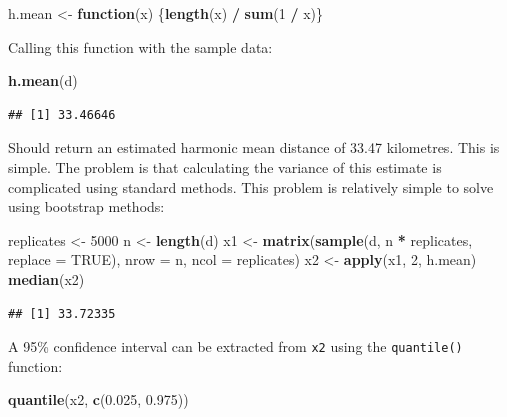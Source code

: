 \documentclass[12pt,a4paper]{book}
\newenvironment{Shaded}{\begin{snugshade}}{\end{snugshade}}
\newcommand{\ControlFlowTok}[1]{\textcolor[rgb]{0.13,0.29,0.53}{\textbf{#1}}}
\newcommand{\DataTypeTok}[1]{\textcolor[rgb]{0.13,0.29,0.53}{#1}}
\newcommand{\DecValTok}[1]{\textcolor[rgb]{0.00,0.00,0.81}{#1}}
\newcommand{\FloatTok}[1]{\textcolor[rgb]{0.00,0.00,0.81}{#1}}
\newcommand{\KeywordTok}[1]{\textcolor[rgb]{0.13,0.29,0.53}{\textbf{#1}}}
\newcommand{\NormalTok}[1]{#1}
\newcommand{\OperatorTok}[1]{\textcolor[rgb]{0.81,0.36,0.00}{\textbf{#1}}}
\newcommand{\OtherTok}[1]{\textcolor[rgb]{0.56,0.35,0.01}{#1}}
\newcommand{\StringTok}[1]{\textcolor[rgb]{0.31,0.60,0.02}{#1}}
\theoremstyle{definition}
\theoremstyle{definition}
\theoremstyle{definition}
\theoremstyle{remark}
\begin{document}
\begin{Shaded}
\begin{Highlighting}[]
\NormalTok{h.mean <-}\StringTok{ }\ControlFlowTok{function}\NormalTok{(x) \{}\KeywordTok{length}\NormalTok{(x) }\OperatorTok{/}\StringTok{ }\KeywordTok{sum}\NormalTok{(}\DecValTok{1} \OperatorTok{/}\StringTok{ }\NormalTok{x)\}}
\end{Highlighting}
\end{Shaded}

Calling this function with the sample data:

\begin{Shaded}
\begin{Highlighting}[]
\KeywordTok{h.mean}\NormalTok{(d)}
\end{Highlighting}
\end{Shaded}

\begin{verbatim}
## [1] 33.46646
\end{verbatim}

Should return an estimated harmonic mean distance of 33.47 kilometres.
This is simple. The problem is that calculating the variance of this
estimate is complicated using standard methods. This problem is
relatively simple to solve using bootstrap methods:

\begin{Shaded}
\begin{Highlighting}[]
\NormalTok{replicates <-}\StringTok{ }\DecValTok{5000}
\NormalTok{n <-}\StringTok{ }\KeywordTok{length}\NormalTok{(d)}
\NormalTok{x1 <-}\StringTok{ }\KeywordTok{matrix}\NormalTok{(}\KeywordTok{sample}\NormalTok{(d, n }\OperatorTok{*}\StringTok{ }\NormalTok{replicates, }\DataTypeTok{replace =} \OtherTok{TRUE}\NormalTok{),}
             \DataTypeTok{nrow =}\NormalTok{ n, }\DataTypeTok{ncol =}\NormalTok{ replicates)}
\NormalTok{x2 <-}\StringTok{ }\KeywordTok{apply}\NormalTok{(x1, }\DecValTok{2}\NormalTok{, h.mean)}
\KeywordTok{median}\NormalTok{(x2)}
\end{Highlighting}
\end{Shaded}

\begin{verbatim}
## [1] 33.72335
\end{verbatim}

A 95\% confidence interval can be extracted from \texttt{x2} using the
\texttt{quantile()} function:

\begin{Shaded}
\begin{Highlighting}[]
\KeywordTok{quantile}\NormalTok{(x2, }\KeywordTok{c}\NormalTok{(}\FloatTok{0.025}\NormalTok{, }\FloatTok{0.975}\NormalTok{))}
\end{Highlighting}
\end{Shaded}
\end{document}
